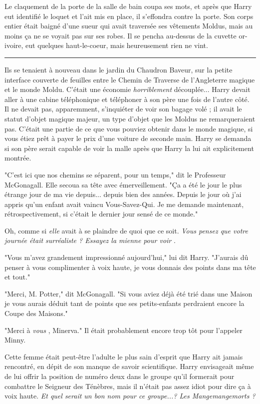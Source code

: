 Le claquement de la porte de la salle de bain coupa ses mots, et après que Harry eut identifié le loquet et l'ait mis en place, il s'effondra contre la porte. Son corps entier était baigné d'une sueur qui avait traversée ses vêtements Moldus, mais au moins ça ne se voyait pas sur ses robes. Il se pencha au-dessus de la cuvette or-ivoire, eut quelques haut-le-coeur, mais heureusement rien ne vint.
\par\noindent\rule{\textwidth}{0.4pt}
Ils se tenaient à nouveau dans le jardin du Chaudron Baveur, sur la petite interface couverte de feuilles entre le Chemin de Traverse de l'Angleterre magique et le monde Moldu. C'était une économie \emph{horriblement}  découplée... Harry devait aller à une cabine téléphonique et téléphoner à son père une fois de l'autre côté. Il ne devait pas, apparemment, s'inquiéter de voir son bagage volé ; il avait le statut d'objet magique majeur, un type d'objet que les Moldus ne remarqueraient pas. C'était une partie de ce que vous pouviez obtenir dans le monde magique, si vous étiez prêt à payer le prix d'une voiture de seconde main. Harry se demanda si son père serait capable de voir la malle après que Harry la lui ait explicitement montrée.

"C'est ici que nos chemins se séparent, pour un temps," dit le Professeur McGonagall. Elle secoua sa tête avec émerveillement. "Ça a été le jour le plus étrange jour de ma vie depuis... depuis bien des années. Depuis le jour où j'ai appris qu'un enfant avait vaincu Vous-Savez-Qui. Je me demande maintenant, rétrospectivement, si c'était le dernier jour sensé de ce monde."

Oh, comme si \emph{elle}  avait à se plaindre de quoi que ce soit. \emph{Vous pensez que votre journée était surréaliste ? Essayez la mienne pour voir} .

"Vous m'avez grandement impressionné aujourd'hui," lui dit Harry. "J'aurais dû penser à vous complimenter à voix haute, je vous donnais des points dans ma tête et tout."

"Merci, M. Potter," dit McGonagall. "Si vous aviez déjà été trié dans une Maison je vous aurais déduit tant de points que ses petits-enfants perdraient encore la Coupe des Maisons."

"Merci à \emph{vous} , Minerva." Il était probablement encore trop tôt pour l'appeler Minny.

Cette femme était peut-être l'adulte le plus sain d'esprit que Harry ait jamais rencontré, en dépit de son manque de savoir scientifique. Harry envisageait même de lui offrir la position de numéro deux dans le groupe qu'il formerait pour combattre le Seigneur des Ténèbres, mais il n'était pas assez idiot pour dire ça à voix haute. \emph{Et quel serait un bon nom pour ce groupe...? Les Mangemangemorts ?} 

